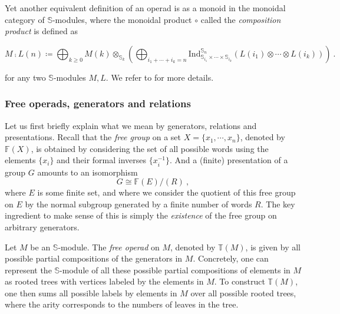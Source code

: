 \documentclass[a4paper,12pt]{amsart}
\begin{document}
\begin{remark}
Yet another equivalent definition of an operad is as a monoid in the monoidal category of $\mathbb{S}$-modules, where the  monoidal product $\circ$ called the \textit{composition product} is defined as 

\[
M \comp L(n) \coloneqq \bigoplus_{k\geq 0} M(k) \otimes_{\mathbb{S}_k} \left( \bigoplus_{i_1 + \cdots + i_k = n} \mathrm{Ind}_{\mathbb{S}_{i_1} \times \cdots \times \mathbb{S}_{i_k}}^{\mathbb{S}_n} (L(i_1) \otimes \cdots \otimes L(i_k))\right)~.
\]
\vspace{0.1pc}

for any two $\mathbb{S}$-modules $M,L$. We refer to \cite[Chapter 5]{LodayVallette} for more details.
\end{remark}

\subsubsection{Free operads, generators and relations} Let us first briefly explain what we mean by generators, relations and presentations. Recall that the \textit{free group} on a set $X = \{x_1,\cdots,x_n\}$, denoted by $\mathbb{F}(X)$, is obtained by considering the set of all possible words using the elements $\{x_i\}$ and their formal inverses $\{x_i^{-1}\}$. And a (finite) presentation of a group $G$ amounts to an isomorphism 
\[
G \cong \mathbb{F}(E)/(R)~,
\]
where $E$ is some finite set, and where we consider the quotient of this free group on $E$ by the normal subgroup generated by a finite number of words $R$. The key ingredient to make sense of this is simply the \textit{existence} of the free group on arbitrary generators.

\medskip

Let $M$ be an $\mathbb{S}$-module. The \textit{free operad} on $M$, denoted by $\mathbb{T}(M)$, is given by all possible partial compositions of the generators in $M$. Concretely, one can represent the $\mathbb{S}$-module of all these possible partial compositions of elements in $M$ as rooted trees with vertices labeled by the elements in $M$. To construct $\mathbb{T}(M)$, one then sums all possible labels by elements in $M$ over all possible rooted trees, where the arity corresponds to the numbers of leaves in the tree. 

\medskip
\end{document}

